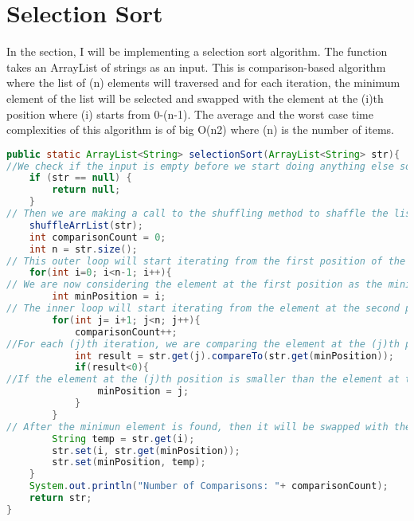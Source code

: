 \documentclass{article}
\begin{document}
\section{Selection Sort}
In the section, I will be implementing a selection sort algorithm. The function takes an ArrayList of strings as an input. This is comparison-based algorithm where the list of (n) elements will traversed and for each iteration, the minimum element of the list will be selected and swapped with the element at the (i)th position where (i) starts from 0-(n-1). The average and the worst case time complexities of this algorithm is of big O(n2) where (n) is the number of items.
\begin{lstlisting}[language=Java]
public static ArrayList<String> selectionSort(ArrayList<String> str){
//We check if the input is empty before we start doing anything else so we can save time and computing power
    if (str == null) {
        return null;
    }
// Then we are making a call to the shuffling method to shaffle the list before we start sorting. 
    shuffleArrList(str);
    int comparisonCount = 0;
    int n = str.size();
// This outer loop will start iterating from the first position of the list (i=0) up to (n-1) where n is the size of the list.
    for(int i=0; i<n-1; i++){
// We are now considering the element at the first position as the minimum element. 
        int minPosition = i;
// The inner loop will start iterating from the element at the second position of the list up to the last element.
        for(int j= i+1; j<n; j++){
            comparisonCount++;
//For each (j)th iteration, we are comparing the element at the (j)th position with the element at our minimum positon. Since we are using an ArrayList, we use the obj.compareTo(obj) method to compare the two strings. This method will return a positive integer if the first (obj) is greater than the second (obj) alphabetically, otherwise it will return a negative integer. Also, this method will return 0 if both the strings are the same. Then we will save the outcome in an int variable called result.  
            int result = str.get(j).compareTo(str.get(minPosition));
            if(result<0){
//If the element at the (j)th position is smaller than the element at the minimum position, we then update the minimum position to the (j)th position.
                minPosition = j;
            }
        }
// After the minimun element is found, then it will be swapped with the element at the (i)th position.
        String temp = str.get(i);
        str.set(i, str.get(minPosition));
        str.set(minPosition, temp);  
    }
    System.out.println("Number of Comparisons: "+ comparisonCount);
    return str;
}
\end{lstlisting}
\end{document}
